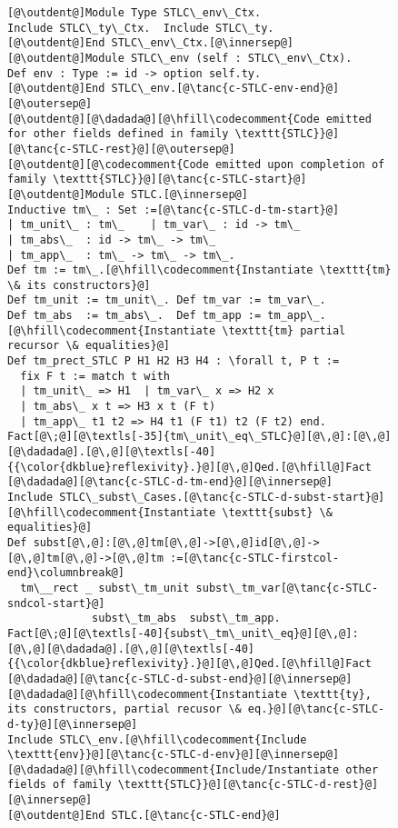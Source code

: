 \begin{figure}
\begin{minipage}{\textwidth}
\begin{multicols}{2}
\begin{lstlisting}
[@\outdent@]Module Type STLC\_env\_Ctx.
Include STLC\_ty\_Ctx.  Include STLC\_ty.
[@\outdent@]End STLC\_env\_Ctx.[@\innersep@]
[@\outdent@]Module STLC\_env (self : STLC\_env\_Ctx).
Def env : Type := id -> option self.ty.
[@\outdent@]End STLC\_env.[@\tanc{c-STLC-env-end}@][@\outersep@]
[@\outdent@][@\dadada@][@\hfill\codecomment{Code emitted for other fields defined in family \texttt{STLC}}@][@\tanc{c-STLC-rest}@][@\outersep@]
[@\outdent@][@\codecomment{Code emitted upon completion of family \texttt{STLC}}@][@\tanc{c-STLC-start}@]
[@\outdent@]Module STLC.[@\innersep@]
Inductive tm\_ : Set :=[@\tanc{c-STLC-d-tm-start}@]
| tm_unit\_ : tm\_    | tm_var\_ : id -> tm\_
| tm_abs\_  : id -> tm\_ -> tm\_
| tm_app\_  : tm\_ -> tm\_ -> tm\_.
Def tm := tm\_.[@\hfill\codecomment{Instantiate \texttt{tm} \& its constructors}@]
Def tm_unit := tm_unit\_. Def tm_var := tm_var\_.
Def tm_abs  := tm_abs\_.  Def tm_app := tm_app\_.
[@\hfill\codecomment{Instantiate \texttt{tm} partial recursor \& equalities}@]
Def tm_prect_STLC P H1 H2 H3 H4 : \forall t, P t :=
  fix F t := match t with
  | tm_unit\_ => H1  | tm_var\_ x => H2 x
  | tm_abs\_ x t => H3 x t (F t)
  | tm_app\_ t1 t2 => H4 t1 (F t1) t2 (F t2) end.
Fact[@\;@][@\textls[-35]{tm\_unit\_eq\_STLC}@][@\,@]:[@\,@][@\dadada@].[@\,@][@\textls[-40]{{\color{dkblue}reflexivity}.}@][@\,@]Qed.[@\hfill@]Fact [@\dadada@][@\tanc{c-STLC-d-tm-end}@][@\innersep@]
Include STLC\_subst\_Cases.[@\tanc{c-STLC-d-subst-start}@]
[@\hfill\codecomment{Instantiate \texttt{subst} \& equalities}@]
Def subst[@\,@]:[@\,@]tm[@\,@]->[@\,@]id[@\,@]->[@\,@]tm[@\,@]->[@\,@]tm :=[@\tanc{c-STLC-firstcol-end}\columnbreak@]
  tm\__rect _ subst\_tm_unit subst\_tm_var[@\tanc{c-STLC-sndcol-start}@]
             subst\_tm_abs  subst\_tm_app.
Fact[@\;@][@\textls[-40]{subst\_tm\_unit\_eq}@][@\,@]:[@\,@][@\dadada@].[@\,@][@\textls[-40]{{\color{dkblue}reflexivity}.}@][@\,@]Qed.[@\hfill@]Fact [@\dadada@][@\tanc{c-STLC-d-subst-end}@][@\innersep@]
[@\dadada@][@\hfill\codecomment{Instantiate \texttt{ty}, its constructors, partial recusor \& eq.}@][@\tanc{c-STLC-d-ty}@][@\innersep@]
Include STLC\_env.[@\hfill\codecomment{Include \texttt{env}}@][@\tanc{c-STLC-d-env}@][@\innersep@]
[@\dadada@][@\hfill\codecomment{Include/Instantiate other fields of family \texttt{STLC}}@][@\tanc{c-STLC-d-rest}@][@\innersep@]
[@\outdent@]End STLC.[@\tanc{c-STLC-end}@]
\end{lstlisting}


\end{multicols}
\end{minipage}
\end{figure}
